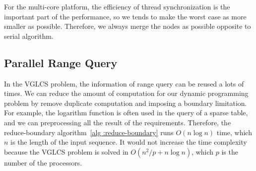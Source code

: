 

For the multi-core platform, the efficiency of thread synchronization is
the important part of the performance, so we tends to make the worst
case as more smaller as possible.  Therefore, we always merge the nodes
as possible opposite to serial algorithm.



\iffalse
在單一處理器下，由於動態規劃常會遇到不合定義而填入連續的 0，
多次的插入操作可以直到下一個非零的時候再進行，同時也改善查表的花費，
直到下一個非零的才進行的操作，增加嚴重增加某一次操作的時間。

在多核心平台下，要避免單一操作時間過長，一旦單一操作時間過長，
多個工作的同步將變得非常沒有效率。因此，每一次操作都強制合併，這有別於循序算法的版本。
\fi

\subsection{Parallel Range Query}


In the VGLCS problem, the information of range query can be reused a
lots of times.  We can reduce the amount of computation for our dynamic
programming problem by remove duplicate computation and imposing a
boundary limitation.  For example, the logarithm function is often used
in the query of a sparse table, and we can preprocessing all the result
of the requirements.  Therefore, the reduce-boundary algorithm~\ref{alg
:reduce-boundary} runs $O(n \log n)$ time, which $n$  is the length of
the input sequence.  It would not increase the time complexity because
the VGLCS problem is solved in  $O(n^2 / p + n \log n)$, which $p$ is
the number of the processors.


\iffalse
運行區間查找時，一般依賴內建函數在 $O(1)$ 時間完成對數取整，
然而，在 VGLCS 這類型的動態規劃中，區間查找的對數結果是可以被預測的，預先將每一組詢問的區段對數結果儲存在陣列中，便可降低指令次數。
\fi

\iffalse
由於已知所有詢問區間，建立稀疏表時，可藉由動態規劃在 $O(n \log n)$ 排除掉不可能的計算 (參照算法 ~\ref{alg:reduce-boundary})，
降低過程中的計算量。由於 VGLCS 在平行操作需要 $O(n \log n)$，故使用動態規劃不影響我們的最終結果。
\fi


